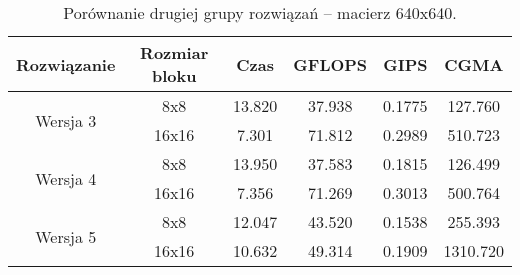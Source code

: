 \begin{table}[H]
\centering
\begin{tabular}{|c|c|c|c|c|c|}
\hline
Rozwiązanie & Rozmiar bloku & Czas & GFLOPS & GIPS & CGMA \\ \hline
\multirow{2}{*}{Wersja 3} & 8x8 & 13.820 & 37.938 & 0.1775 & 127.760 \\ \cline{2-6}
& 16x16 & 7.301 & 71.812 & 0.2989 & 510.723 \\ \hline
\multirow{2}{*}{Wersja 4} & 8x8 & 13.950 & 37.583 & 0.1815 & 126.499 \\ \cline{2-6}
& 16x16 & 7.356 & 71.269 & 0.3013 & 500.764 \\ \hline
\multirow{2}{*}{Wersja 5} & 8x8 & 12.047 & 43.520 & 0.1538 & 255.393 \\ \cline{2-6}
& 16x16 & 10.632 & 49.314 & 0.1909 & 1310.720 \\ \hline
\end{tabular}
\caption{Porównanie drugiej grupy rozwiązań -- macierz 640x640.}
\end{table}


